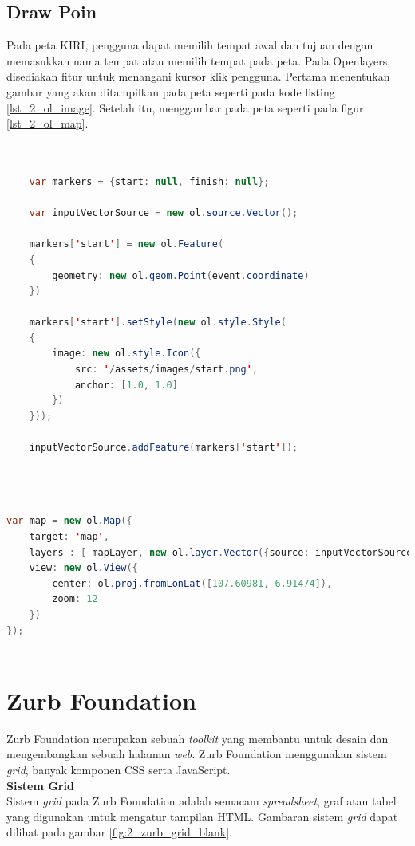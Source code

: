 \subsection{Draw Poin}
Pada peta KIRI, pengguna dapat memilih tempat awal dan tujuan dengan memasukkan nama tempat atau memilih tempat pada peta. Pada Openlayers, disediakan fitur untuk menangani kursor klik pengguna. Pertama menentukan gambar yang akan ditampilkan pada peta seperti pada kode listing \ref{lst_2_ol_image}. Setelah itu, menggambar pada peta seperti pada figur \ref{lst_2_ol_map}.


\begin{lstlisting}[caption=Menentukan gambar yang akan dipakai pada peta,label = {lst_2_ol_image},language=Java]

	
	var markers = {start: null, finish: null};
	
	var inputVectorSource = new ol.source.Vector();

	markers['start'] = new ol.Feature(
	{
		geometry: new ol.geom.Point(event.coordinate)
	})
	
	markers['start'].setStyle(new ol.style.Style(
	{
		image: new ol.style.Icon({
			src: '/assets/images/start.png',
			anchor: [1.0, 1.0]
		})
	}));
	
	inputVectorSource.addFeature(markers['start']);
	
	
\end{lstlisting}


\begin{lstlisting}[caption=Menambahkan vektor pada peta,label = {lst_2_ol_map},language=Java]
	
var map = new ol.Map({
    target: 'map',
    layers : [ mapLayer, new ol.layer.Vector({source: inputVectorSource}), new ol.layer.Vector({source: resultVectorSource}) ],
    view: new ol.View({
        center: ol.proj.fromLonLat([107.60981,-6.91474]),
        zoom: 12
    })
});
		
\end{lstlisting}

\section{Zurb Foundation}
\label{sec:zurbfoundation}

Zurb Foundation \cite{zurbfoundationbook} merupakan sebuah \textit{toolkit} yang membantu untuk desain dan mengembangkan sebuah halaman \textit{web}. Zurb Foundation menggunakan sistem \textit{grid}, banyak komponen CSS serta JavaScript.\\[1\baselineskip]
\textbf{Sistem Grid}\\
Sistem \textit{grid} pada Zurb Foundation adalah semacam \textit{spreadsheet}, graf atau tabel yang digunakan untuk mengatur tampilan HTML. Gambaran sistem \textit{grid} dapat dilihat pada gambar \ref{fig:2_zurb_grid_blank}.

